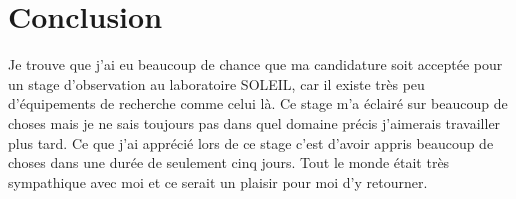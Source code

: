 





			
	\chapter*{Conclusion}
		
       Je trouve que j'ai eu beaucoup de chance que ma candidature soit acceptée pour un stage d'observation au laboratoire SOLEIL, car il existe très peu d'équipements de recherche comme celui là. Ce stage m'a éclairé sur beaucoup de choses mais je ne sais toujours pas dans quel domaine précis j'aimerais travailler plus tard. Ce que j'ai apprécié lors de ce stage c'est d'avoir appris beaucoup de choses dans une durée de seulement cinq jours.
       Tout le monde était très sympathique avec moi et ce serait un plaisir pour moi d'y retourner.
